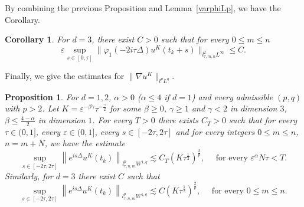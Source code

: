 \documentclass[10pt,a4paper]{article}
\newtheorem{corollary}[theorem]{Corollary}
\newtheorem{proposition}[theorem]{Proposition}
\begin{document}
  By combining the previous Proposition and Lemma~\ref{varphiLp}, we have the
  Corollary.
  \begin{corollary}\label{phiuKL2Linftyd3}
    For \(d=3\), there exist \(C>0\) such that for every \(0\leq m\leq n\)
    \[ \varepsilon \sup_{s\in[0,\tau]} \|\varphi_1(-2i\tau\Delta)u^K(t_k+s)\|_{l^2_{\tau,m,n}L^\infty} 
    \leq C. \]
  \end{corollary}
  
  
  Finally, we give the estimates for \(\|\nabla u^K\|_{l^p L^q}\).

  \begin{proposition}\label{DuKlpLq}
    For \(d =1,2\), \(\alpha>0\) (\(\alpha \leq 4\) if \(d=1\)) and every
    admissible \((p,q)\) with \(p>2\).
    Let \(K = \varepsilon^{-\beta\gamma}\tau^{-\frac\gamma2}\) for some
    \(\beta\geq0\), \(\gamma\geq1\) and \(\gamma<2\) in dimension \(3\), \(\beta
    \leq \frac{4-\alpha}2\) in dimension \(1\). 
    For every \(T>0\) there exists \(C_T>0\) such that 
    for every \( \tau \in (0,1] \), every \(\varepsilon \in (0,1]\), 
    every \(s \in [-2\tau,2\tau] \) and for every integers 
    \(0 \leq m \leq n \), \(n=m+N\), we have the estimate
    \begin{equation}
      \sup_{s\in[-2\tau,2\tau]} \left\|e^{is\Delta} u^K(t_k)\right\|_{l^p_{\tau,n,m}W^{1,q}}
       \lesssim C_T (K\tau^\frac12)^\frac2p, \quad \text{ for every }
       \varepsilon^\alpha N\tau < T.
    \end{equation}
    Similarly, for \(d=3\) there exist \(C\) such that 
    \begin{equation}
      \sup_{s\in[-2\tau,2\tau]} \left\|e^{is\Delta} u^K(t_k)\right\|_{l^p_{\tau,n,m}W^{1,q}}
       \lesssim C (K\tau^\frac12)^\frac2p, \quad \text{ for every } 0 \leq m
       \leq n.
    \end{equation}
  \end{proposition}
\end{document}
